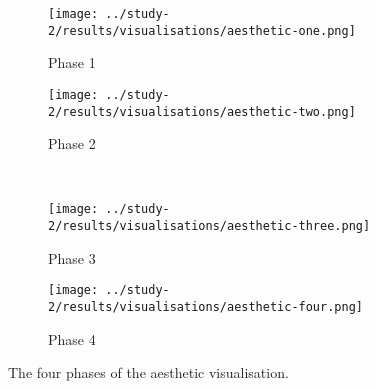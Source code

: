 \begin{figure}
\centering
\begin{subfigure}{.5\textwidth}
  \centering
  \texttt{[image: ../study-2/results/visualisations/aesthetic-one.png]}
  \caption{Phase 1}
  \label{fig:aesthetic-one}
\end{subfigure}%
\begin{subfigure}{.5\textwidth}
  \centering
  \texttt{[image: ../study-2/results/visualisations/aesthetic-two.png]}
  \caption{Phase 2}
  \label{fig:aesthetic-two}
\end{subfigure}\\
\begin{subfigure}{.5\textwidth}
  \centering
  \texttt{[image: ../study-2/results/visualisations/aesthetic-three.png]}
  \caption{Phase 3}
  \label{fig:aesthetic-three}
\end{subfigure}%
\begin{subfigure}{.5\textwidth}
  \centering
  \texttt{[image: ../study-2/results/visualisations/aesthetic-four.png]}
  \caption{Phase 4}
  \label{fig:aesthetic-four}
\end{subfigure}

\caption[Aesthetic visualisation phases]{The four phases of the aesthetic visualisation.}
\label{fig:aesthetic-visualisations}
\end{figure}